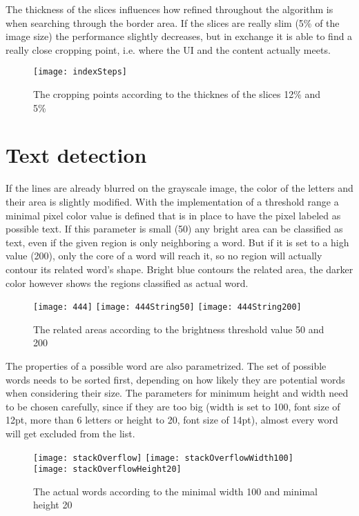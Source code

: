 \documentclass[draft,final]{vutinfth} %
\begin{document}
	The thickness of the slices influences how refined throughout the algorithm is when searching through the border area.
	If the slices are really slim (5\% of the image size) the performance slightly decreases, but in exchange it is able to find a really close cropping point, i.e. where the UI and the content actually meets.\par
	\begin{figure}[H]
		\centering
		\texttt{[image: indexSteps]}
		\caption{The cropping points according to the thicknes of the slices 12\% and 5\%}
		\label{fig:res:steps}
	\end{figure}
	\section{Text detection}
	If the lines are already blurred on the grayscale image, the color of the letters and their area is slightly modified. 
	With the implementation of a threshold range a minimal pixel color value is defined that is in place to have the pixel labeled as possible text.
	If this parameter is small (50) any bright area can be classified as text, even if the given region is only neighboring a word.
	But if it is set to a high value (200), only the core of a word will reach it, so no region will actually contour its related word's shape.
	Bright blue contours the related area, the darker color however shows the regions classified as actual word.\par
	\begin{figure}[H]
		\texttt{[image: 444]}\hfill
		\texttt{[image: 444String50]}\hfill
		\texttt{[image: 444String200]}
		\caption{The related areas according to the brightness threshold value 50 and 200 }
	\end{figure} 
	The properties of a possible word are also parametrized.
	The set of possible words needs to be sorted first, depending on how likely they are potential words when considering their size.
	The parameters for minimum height and width need to be chosen carefully, since if they are too big (width is set to 100, font size of 12pt, more than 6 letters or height to 20, font size of 14pt), almost every word will get excluded from the list.
	\begin{figure}[H]
		\texttt{[image: stackOverflow]}\hfill
		\texttt{[image: stackOverflowWidth100]}\hfill
		\texttt{[image: stackOverflowHeight20]}
		\caption{The actual words according to the minimal width 100 and minimal height 20 }
	\end{figure}  
\end{document}
